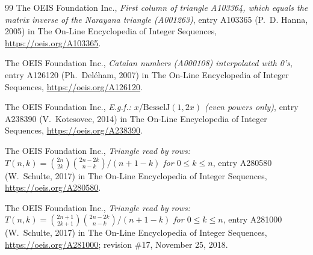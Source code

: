 \documentclass[11pt]{amsart}
\theoremstyle{plain}
\theoremstyle{definition}
\begin{document}
{\begin{thebibliography}{99}
The OEIS Foundation Inc., \emph{First column of triangle A103364, which equals the matrix inverse of the Narayana triangle (A001263)}, entry A103365 (P.~D. Hanna, 2005) in The On-Line Encyclopedia of Integer Sequences, \url{https://oeis.org/A103365}.

The OEIS Foundation Inc., \emph{Catalan numbers (A000108) interpolated with 0's}, entry A126120 (Ph.~Del\'eham, 2007) in The On-Line Encyclopedia of Integer Sequences, \url{https://oeis.org/A126120}.

The OEIS Foundation Inc., \emph{E.g.f.: $x/\mathrm{BesselJ}(1,2x)$ (even powers only)}, entry A238390 (V.~Kotesovec, 2014) in The On-Line Encyclopedia of Integer Sequences, \url{https://oeis.org/A238390}.

The OEIS Foundation Inc., \emph{Triangle read by rows: $T(n,k)=\binom{2n}{2k}\binom{2n-2k}{n-k}/(n+1-k)$ for $0\le k\le n$}, entry A280580 (W.~Schulte, 2017) in The On-Line Encyclopedia of Integer Sequences, \url{https://oeis.org/A280580}.

The OEIS Foundation Inc., \emph{Triangle read by rows: $T(n,k)=\binom{2n+1}{2k+1}\binom{2n-2k}{n-k}/(n+1-k)$ for $0\le k\le n$}, entry A281000 (W.~Schulte, 2017) in The On-Line Encyclopedia of Integer Sequences, \url{https://oeis.org/A281000}; revision \#17, November 25, 2018.

\end{thebibliography}
}
\end{document}
